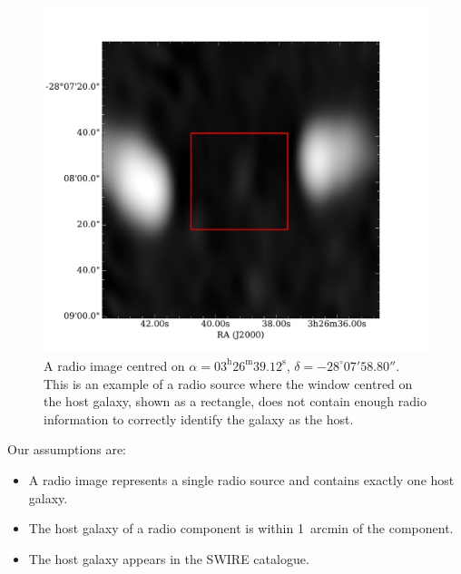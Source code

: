 \documentclass[fleqn,usenatbib,usedcolumn]{mnras}
\begin{document}
        \begin{figure}
      \centering
      \includegraphics[width=\linewidth]{images/ARG0003sky_radio}
      \caption{A radio image centred on $\alpha =
        03^\text{h}26^\text{m}39.12^\text{s}$, $\delta = -28^\circ{}07'58.80''$.        %
        This is an example of a radio source where the window centred on the
        host galaxy, shown as a rectangle, does not contain enough radio
        information to correctly identify the galaxy as the host.}
      \label{fig:broken-window-size}
    \end{figure}

  \label{sec:limitations}

    Our assumptions are:
    \begin{itemize}
      \item A radio image represents a single radio source and contains exactly
        one host galaxy.
      \item The host galaxy of a radio component is within 1~arcmin of the
        component.
      \item The host galaxy appears in the SWIRE catalogue.
    \end{itemize}
\end{document}
